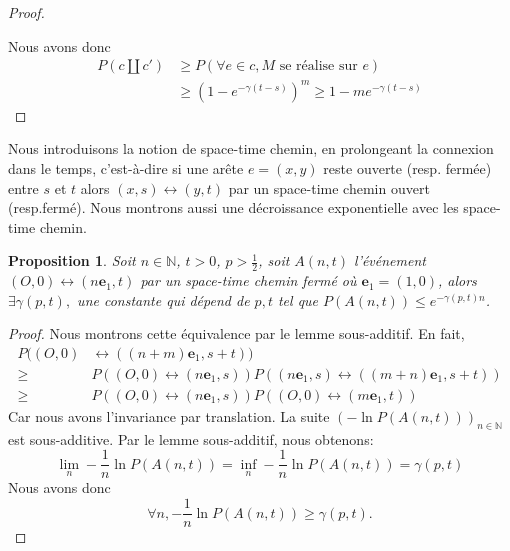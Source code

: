 \documentclass[titlepage,a4paper,12pt]{article}
\newcounter{prop}
\newtheorem{stc}[prop]{Proposition}
\begin{document}
\begin{proof}
\begin{figure}[h]
\end{figure}

Nous avons donc 
\begin{align*}
 P(c \coprod c') &\geqslant P(\forall e \in c, M \text{ se réalise sur } e) \\
 & \geqslant (1-e^{-\gamma (t-s)})^m \geqslant 1-me^{-\gamma (t-s)}
\end{align*} 
\end{proof}

Nous introduisons la notion de space-time chemin, en prolongeant la connexion dans le temps, c'est-à-dire si une arête $e=(x,y)$ reste ouverte (resp. fermée) entre $s$ et $t$ alors $(x,s)\longleftrightarrow (y,t)$ par un space-time chemin ouvert (resp.fermé). Nous montrons aussi une décroissance exponentielle avec les space-time chemin.

\begin{stc} \label{stc} Soit $n\in \mathbb{N}$, $t>0$, $p> \frac{1}{2}$, soit $ A(n,t)$ l'événement $(O,0) \leftrightarrow (n\mathbf{e}_1,t)$ par un space-time chemin fermé où $\mathbf{e}_1 = (1,0)$, alors $\exists \gamma(p,t),$ une constante qui dépend de $p,t$ tel que $P(A(n,t)) \leqslant e^{-\gamma(p,t)n}$.
\end{stc}

\begin{proof}
Nous montrons cette équivalence par le lemme sous-additif. En fait, 
\begin{align*}
P((O,0)& \leftrightarrow ((n+m)\mathbf{e}_1,s+t)) \\
\geqslant & P((O,0)\leftrightarrow (n\mathbf{e}_1,s))P((n\mathbf{e}_1,s)\leftrightarrow ((m+n)\mathbf{e}_1,s+t))\\
\geqslant & P((O,0)\leftrightarrow (n\mathbf{e}_1,s))P((O,0)\leftrightarrow (m\mathbf{e}_1,t))
\end{align*}
Car nous avons l'invariance par translation. La suite $(-\ln P(A(n,t)))_{n\in \mathbb{N}}$ est sous-additive. Par le lemme sous-additif, nous obtenons:
$$
\lim_{n}-\frac{1}{n}\ln P(A(n,t)) = \inf_{n} -\frac{1}{n}\ln P(A(n,t)) = \gamma(p,t)
$$
Nous avons donc
$$ \forall n, -\frac{1}{n}\ln P(A(n,t)) \geqslant \gamma(p,t).
$$
\end{proof}
\end{document}
